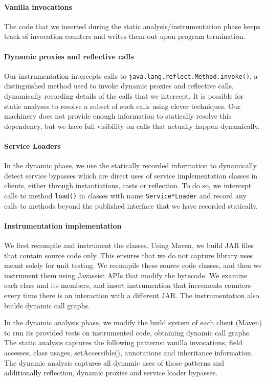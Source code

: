 \paragraph{Vanilla invocations} The code that we inserted during the
static analysis/instrumentation phase keeps track of invocation counters
and writes them out upon program termination.

\paragraph{Dynamic proxies and reflective calls}
Our instrumentation intercepts calls to
\texttt{java.lang.reflect.Method.invoke()}, a distinguished method
used to invoke dynamic proxies and reflective calls, dynamically
recording details of the calls that we intercept. It is possible for
static analyses to resolve a subset of such calls using clever
techniques. Our machinery does not provide enough information to
statically resolve this dependency, but we have full visibility on
calls that actually happen dynamically.

\paragraph{Service Loaders} In the dynamic phase, we use the statically recorded information to dynamically detect service bypasses which are direct uses of service implementation 
classes in clients, either through instantiations, casts or reflection. To do so, we intercept calls 
to method \texttt{load()} in classes with name \texttt{Service*Loader} and record any calls to methods beyond 
the published interface that we have recorded statically.

\paragraph{Instrumentation implementation}
We first recompile and instrument the classes. Using Maven, we build JAR
files that contain source code only. This ensures that we do not
capture library uses meant solely for unit testing.  We recompile
these source code classes, and then we instrument them using Javassist
APIs that modify the bytecode. We examine each class and its members,
and insert instrumention that increments counters every time there is
an interaction with a different JAR. The instrumentation also builds
dynamic call graphs.



In the dynamic analysis phase, we modify the build system of each
client (Maven) to run its provided tests on instrumented code,
obtaining dynamic call graphs.  The static analysis captures the
following patterns: vanilla invocations, field accesses, class usages,
setAccessible(), annotations and inheritance information. The dynamic
analysis captures all dynamic uses of those patterns and additionally
reflection, dynamic proxies and service loader bypasses.

